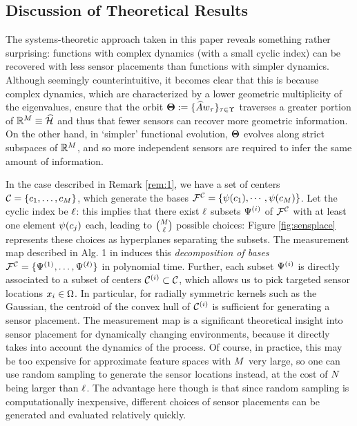 \subsection{Discussion of Theoretical Results}\label{sec:discussion}
The systems-theoretic approach taken in this paper reveals something rather surprising: functions with complex dynamics (with a small cyclic index) can be recovered with less sensor placements than functions with simpler dynamics. Although seemingly counterintuitive, it becomes clear that this is because complex dynamics, which are characterized by a lower geometric multiplicity of the eigenvalues, ensure that the orbit $\boldsymbol{\Theta} := \{\widehat{A}w_{\tau}\}_{\tau\in\Upsilon}$ traverses a greater portion of $\mathbb{R}^{M} \equiv \widehat{\mathcal{H}}$ and thus that fewer sensors can recover more geometric information. On the other hand, in `simpler' functional evolution, $\boldsymbol{\Theta}$ evolves along strict subspaces of $\mathbb{R}^{M}$, and so more independent sensors are required to infer the same amount of information. 

In the case described in Remark \ref{rem:1}, we have a set of centers $\mathcal{C}=\{c_1,\dots,c_{M}\}$, which generate the bases $\mathcal{F}^{\mathcal{C}} = \{\psi(c_1), \cdots , \psi(c_{M})\}$. Let the cyclic index be $\ell$: this implies that there exist $\ell$ subsets $\Psi^{(i)}$ of $\mathcal{F}^{\mathcal{C}}$ with at least one element $\psi(c_j)$ each, leading to $\binom{M}{\ell}$ possible choices: Figure \ref{fig:sensplace} represents these choices as hyperplanes separating the subsets. 
The measurement map described in Alg. 1 in \cite{Kingravi16_NIPS} induces this \emph{decomposition of bases} $\mathcal{F}^{\mathcal{C}} = \{\Psi^{(1)},\dots,\Psi^{(\ell)}\}$ in polynomial time. Further, each subset $\Psi^{(i)}$ is directly associated to a subset of centers $\mathcal{C}^{(i)}\subset\mathcal{C}$, which allows us to pick targeted sensor locations $x_i\in\Omega$. In particular, for radially symmetric kernels such as the Gaussian, the centroid of the convex hull of $\mathcal{C}^{(i)}$ is sufficient for generating a sensor placement. The measurement map is a significant theoretical insight into sensor placement for dynamically changing environments, because it directly takes into account the dynamics of the process. Of course, in practice, this may be too expensive for approximate feature spaces with $M$ very large, so one can use random sampling to generate the sensor locations instead, at the cost of $N$ being larger than $\ell$. The advantage here though is that since random sampling is computationally inexpensive, different choices of sensor placements can be generated and evaluated relatively quickly.

